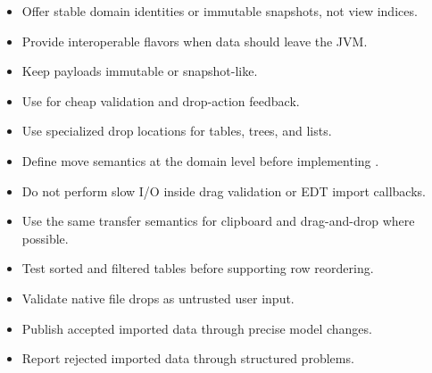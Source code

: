 \begin{itemize}
\item Offer stable domain identities or immutable snapshots, not view indices.
\item Provide interoperable flavors when data should leave the JVM.
\item Keep  payloads immutable or snapshot-like.
\item Use  for cheap validation and drop-action feedback.
\item Use specialized drop locations for tables, trees, and lists.
\item Define move semantics at the domain level before implementing .
\item Do not perform slow I/O inside drag validation or EDT import callbacks.
\item Use the same transfer semantics for clipboard and drag-and-drop where possible.
\item Test sorted and filtered tables before supporting row reordering.
\item Validate native file drops as untrusted user input.
\item Publish accepted imported data through precise model changes.
\item Report rejected imported data through structured problems.
\end{itemize}

